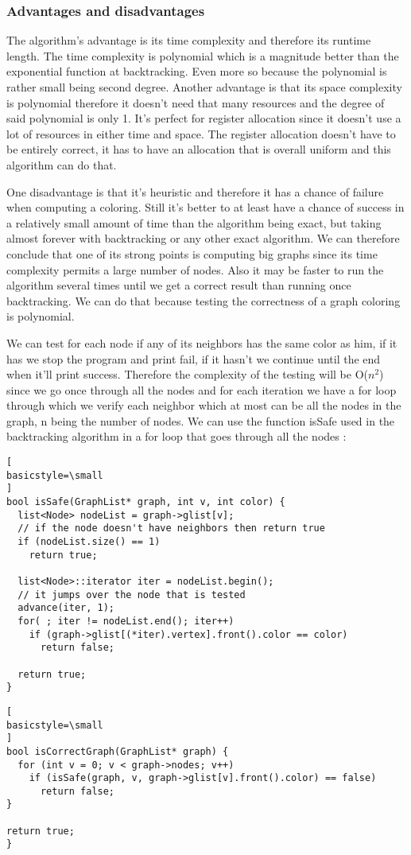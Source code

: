 \documentclass[runningheads]{llncs}
\begin{document}
\subsubsection{Advantages and disadvantages}
The algorithm's advantage is its time complexity and therefore its runtime length. The time complexity is
polynomial which is a magnitude better than the exponential function at backtracking. Even more so because
the polynomial is rather small being second degree. Another advantage is that its space complexity is
polynomial therefore it doesn't need that many resources and the degree of said polynomial is only 1.
It's perfect for register allocation since it doesn't use a lot of resources in either time and space.
The register allocation doesn't have to be entirely correct, it has to have an allocation that is overall
uniform and this algorithm can do that.

One disadvantage is that it's heuristic and therefore it has a chance of failure when computing a coloring.
Still it's better to at least have a chance of success in a relatively small amount of time than the
algorithm being exact, but taking almost forever with backtracking or any other exact algorithm. We can therefore conclude that one
of its strong points is computing big graphs since its time complexity permits a large number of nodes.
Also it may be faster to run the algorithm several times until we get a correct result than running
once backtracking. We can do that because testing the correctness of a graph coloring is polynomial.

We can test for each node if any of its neighbors has the same color as him, if it has we stop the
program and print fail, if it hasn't we continue until the end when it'll print success. Therefore
the complexity of the testing will be O($n^2$) since we go once through all the nodes and for each
iteration we have a for loop through which we verify each neighbor which at most can be all the nodes
in the graph, n being the number of nodes. We can use the function isSafe used in the backtracking
algorithm \cite{ref_url2} in a for loop that goes through all the nodes :
\\
\begin{lstlisting}[
basicstyle=\small
]
bool isSafe(GraphList* graph, int v, int color) {
  list<Node> nodeList = graph->glist[v];
  // if the node doesn't have neighbors then return true
  if (nodeList.size() == 1)
    return true;

  list<Node>::iterator iter = nodeList.begin();
  // it jumps over the node that is tested
  advance(iter, 1);
  for( ; iter != nodeList.end(); iter++)
    if (graph->glist[(*iter).vertex].front().color == color)
      return false;

  return true;
}
\end{lstlisting}
\begin{lstlisting}[
basicstyle=\small
]
bool isCorrectGraph(GraphList* graph) {
  for (int v = 0; v < graph->nodes; v++)
    if (isSafe(graph, v, graph->glist[v].front().color) == false)
      return false;
}

return true;
}
\end{lstlisting}
\end{document}
